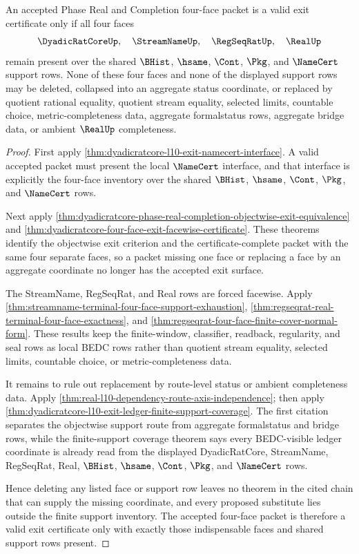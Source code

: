 \begin{theorem}
\label{thm:dyadicratcore-phase-real-completion-exit-support-minimality}
An accepted Phase Real and Completion four-face packet is a valid exit certificate only if all four faces
$$
\DyadicRatCoreUp,\quad \StreamNameUp,\quad \RegSeqRatUp,\quad \RealUp
$$
remain present over the shared $\BHist$, $\hsame$, $\Cont$, $\Pkg$, and $\NameCert$ support rows. None of these four faces and none of the displayed support rows may be deleted, collapsed into an aggregate status coordinate, or replaced by quotient rational equality, quotient stream equality, selected limits, countable choice, metric-completeness data, aggregate formalstatus rows, aggregate bridge data, or ambient $\RealUp$ completeness.
\end{theorem}
\begin{proof}
First apply \autoref{thm:dyadicratcore-l10-exit-namecert-interface}. A valid accepted packet must present the local $\NameCert$ interface, and that interface is explicitly the four-face inventory over the shared $\BHist$, $\hsame$, $\Cont$, $\Pkg$, and $\NameCert$ rows.

Next apply \autoref{thm:dyadicratcore-phase-real-completion-objectwise-exit-equivalence} and \autoref{thm:dyadicratcore-four-face-exit-facewise-certificate}. These theorems identify the objectwise exit criterion and the certificate-complete packet with the same four separate faces, so a packet missing one face or replacing a face by an aggregate coordinate no longer has the accepted exit surface.

The StreamName, RegSeqRat, and Real rows are forced facewise. Apply \autoref{thm:streamname-terminal-four-face-support-exhaustion}, \autoref{thm:regseqrat-real-terminal-four-face-exactness}, and \autoref{thm:regseqrat-four-face-finite-cover-normal-form}. These results keep the finite-window, classifier, readback, regularity, and seal rows as local BEDC rows rather than quotient stream equality, selected limits, countable choice, or metric-completeness data.

It remains to rule out replacement by route-level status or ambient completeness data. Apply \autoref{thm:real-l10-dependency-route-axis-independence}; then apply \autoref{thm:dyadicratcore-l10-exit-ledger-finite-support-coverage}. The first citation separates the objectwise support route from aggregate formalstatus and bridge rows, while the finite-support coverage theorem says every BEDC-visible ledger coordinate is already read from the displayed DyadicRatCore, StreamName, RegSeqRat, Real, $\BHist$, $\hsame$, $\Cont$, $\Pkg$, and $\NameCert$ rows.

Hence deleting any listed face or support row leaves no theorem in the cited chain that can supply the missing coordinate, and every proposed substitute lies outside the finite support inventory. The accepted four-face packet is therefore a valid exit certificate only with exactly those indispensable faces and shared support rows present.
\end{proof}
